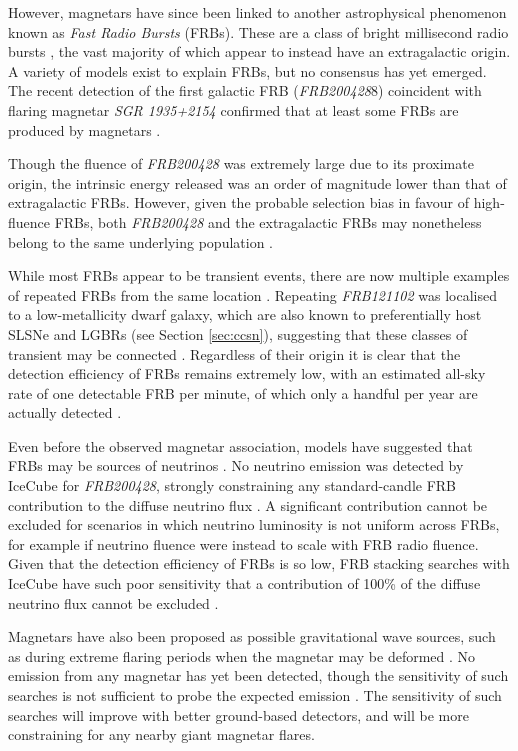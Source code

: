 However, magnetars have since been linked to another astrophysical phenomenon known as \emph{Fast Radio Bursts} (FRBs). These are a class of bright millisecond radio bursts , the vast majority of which appear to instead have an extragalactic origin. A variety of models exist to explain FRBs, but no consensus has yet emerged. The recent detection of the first galactic FRB (\emph{FRB200428}8) coincident with flaring magnetar \emph{SGR 1935+2154} confirmed that at least some FRBs are produced by magnetars . 

Though the fluence of \emph{FRB200428} was extremely large due to its proximate origin, the intrinsic energy released was an order of magnitude lower than that of extragalactic FRBs. However, given the probable selection bias in favour of high-fluence FRBs, both \emph{FRB200428} and the extragalactic FRBs may nonetheless belong to the same underlying population \cite{bochenek_20}.

While most FRBs appear to be transient events, there are now multiple examples of repeated FRBs from the same location . Repeating \emph{FRB121102} was localised to a low-metallicity dwarf galaxy, which are also known to preferentially host SLSNe and LGBRs (see Section \ref{sec:ccsn}), suggesting that these classes of transient may be connected . Regardless of their origin it is clear that the detection efficiency of FRBs remains extremely low, with an estimated all-sky rate of one detectable FRB per minute, of which only a handful per year are actually detected \cite{petroff_frb_19}. 

Even before the observed magnetar association, models have suggested that FRBs may be sources of neutrinos . No neutrino emission was detected by IceCube for \emph{FRB200428}, strongly constraining any standard-candle FRB contribution to the diffuse neutrino flux . A significant contribution cannot be excluded for scenarios in which neutrino luminosity is not uniform across FRBs, for example if neutrino fluence were instead to scale with FRB radio fluence. Given that the detection efficiency of FRBs is so low, FRB stacking searches with IceCube have such poor sensitivity that a contribution of 100\% of the diffuse neutrino flux cannot be excluded .

Magnetars have also been proposed as possible gravitational wave sources, such as during extreme flaring periods when the magnetar may be deformed . No emission from any magnetar has yet been detected, though the sensitivity of such searches is not sufficient to probe the expected emission . The sensitivity of such searches will improve with better ground-based detectors, and will be more constraining for any nearby giant magnetar flares.

